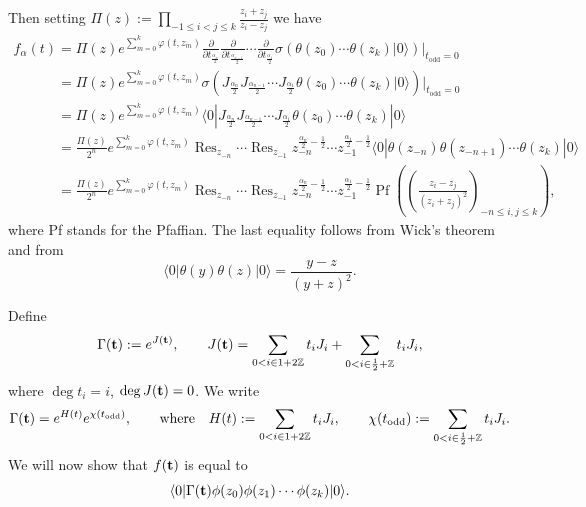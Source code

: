 \documentclass[pdftex]{sigma}
\numberwithin{equation}{section}
\newcommand{\Pf}{\mathop\mathrm{Pf}\nolimits}
\newcommand{\Res}{\mathop\mathrm{Res}\nolimits}
\newcommand{\Z}{\mathbb{Z}}
\newcommand{\INZ}[2]{\in\frac#1#2 +\mathbb{Z}}
\begin{document}
Then setting
$\Pi(z):= \prod\limits_{-1\le i<j\le k}\frac{z_i+{z_j}}{z_i-{z_j}}$
we have
\begin{gather}
\nonumber
f_\alpha(t)  =\Pi(z)
e^{\sum\limits_{m=0}^k \varphi(t,z_m)} \frac{\partial}{\partial
t_{\frac{\alpha_n}2}} \frac{\partial}{\partial t_{\frac{\alpha_{n-1}}2}}
\cdots \frac{\partial}{\partial t_{\frac{\alpha_1}2}}
\sigma\left(\theta(z_0)\cdots\theta(z_{k})|0\rangle\right)\Bigr|_{t_\mathrm{odd}=0}
\\
\phantom{f_\alpha(t)}{}  =\Pi(z)
e^{\sum\limits_{m=0}^k \varphi(t,z_m)} \sigma\left(
J_{\frac{\alpha_n}{2}}J_{\frac{\alpha_{n-1}}{2}} \cdots
J_{\frac{\alpha_{1}}{2}}
\theta(z_0)\cdots\theta(z_{k})|0\rangle\right)\Bigr|_{t_\mathrm{odd}=0}
\nonumber\\
\phantom{f_\alpha(t)}{} =\Pi(z)
e^{\sum\limits_{m=0}^k \varphi(t,z_m)} \langle 0|
J_{\frac{\alpha_n}{2}}J_{\frac{\alpha_{n-1}}{2}} \cdots
J_{\frac{\alpha_{1}}{2}}
\theta(z_0)\cdots\theta(z_{k})|0\rangle
\label{pr1}\\
\phantom{f_\alpha(t)}{} =\frac{\Pi(z)}{2^n}
e^{\sum\limits_{m=0}^k \varphi(t,z_m)}\Res_{z_{-n}}\cdots \Res_{z_{-1}}
z_{-n}^{\frac{\alpha_n}{2}-\frac{1}{2}} \cdots
z_{-1}^{\frac{\alpha_{1}}{2}-\frac{1}{2}} \langle 0|
\theta(z_{-n})
\theta(z_{-n+1})\cdots\theta(z_{k})|0\rangle \nonumber\\
\phantom{f_\alpha(t)}{}=\frac{\Pi(z)}{2^n}
e^{\sum\limits_{m=0}^k \varphi(t,z_m)}\Res_{z_{-n}}\cdots \Res_{z_{-1}}
z_{-n}^{\frac{\alpha_n}{2}-\frac{1}{2}} \cdots
z_{-1}^{\frac{\alpha_{1}}{2}-\frac{1}{2}} \Pf\left( \left(
\frac{z_i-{z_j}}{(z_i+{z_j})^2} \right)_{-n\le i,j\le
k}\right) ,\nonumber
\end{gather}
where Pf stands for the Pfaf\/f\/ian. The last equality follows from
Wick's theorem and from
\[
\langle 0|\theta(y)\theta(z)|0\rangle=\frac{y-{z}}{\left(y+{z}\right)^2}  .
\]


Def\/ine
  \begin{gather}\label{Gamma-bt}
\Gamma({\bf t}):=e^{J({\bf t})}  ,\qquad J({\bf t}) =\sum_{0<
i\in 1+2\Z}  t_i J_{i}+\sum_{0< i\INZ12}  t_i J_{i}  ,
  \end{gather}
where $\deg  t_i = i$, $\deg  J({\bf t}) = 0$.
We write
\begin{gather}\label{Gamma-bt2}
\Gamma({\bf t})=e^{H(t)}e^{\chi(t_\mathrm{odd})} ,\qquad  \mbox{where}\quad
H(t):=\sum_{0< i\in 1+2\Z}  t_i J_{i} ,\qquad
\chi(t_\mathrm{odd}):=\sum_{0< i\INZ12}  t_i J_{i} .
\end{gather}
We will now show that  $f({\bf t})$ is equal to
\[
\langle
0|\Gamma({\bf t})\phi(z_0)\phi(z_1)\cdots\phi(z_{k})|0\rangle  .
\]
\end{document}
